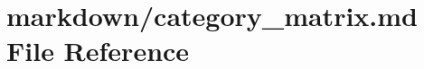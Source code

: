 \hypertarget{category__matrix_8md}{}\section{markdown/category\+\_\+matrix.md File Reference}
\label{category__matrix_8md}
